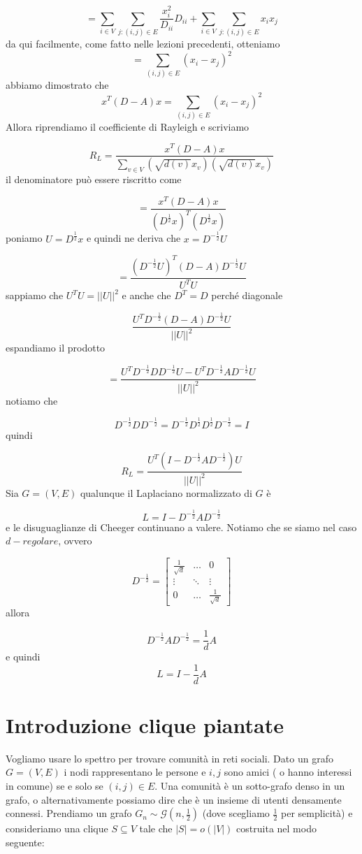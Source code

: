 \documentclass[12pt]{report}
\begin{document}
$$= \sum_{i \in V} \sum_{j : (i,j) \in E} \frac{x_i^2}{D_{ii}} D_{ii} + \sum_{i \in V} \sum_{j : (i,j) \in E} x_i x_j $$
da qui facilmente, come fatto nelle lezioni precedenti, otteniamo
$$= \sum_{(i,j) \in E} (x_i - x_j)^2$$
abbiamo dimostrato che 
$$ x^T (D - A) x= \sum_{(i,j) \in E} (x_i - x_j)^2$$
Allora riprendiamo il coefficiente di Rayleigh e scriviamo

$$R_L = \frac{x^T (D-A) x}{\sum_{v \in V} (\sqrt{d(v)} x_v) (\sqrt{d(v)} x_v)} $$
il denominatore può essere riscritto come

$$= \frac{x^T (D-A) x}{(D^{\frac{1}{2}}x)^T (D^{\frac{1}{2}}x)}$$
poniamo $U = D^{\frac{1}{2}}x$ e quindi ne deriva che $x = D^{-\frac{1}{2}}U$

$$= \frac{(D^{-\frac{1}{2}}U)^T (D-A) D^{-\frac{1}{2}}U}{U^T U}$$
sappiamo che $U^T U = ||U||^2$ e anche che $D^T = D$ perché diagonale

$$\frac{U^T D^{-\frac{1}{2}} (D-A) D^{-\frac{1}{2}}U}{||U||^2}$$
espandiamo il prodotto

$$= \frac{U^T D^{-\frac{1}{2}}D D^{-\frac{1}{2}}U - U^T D^{-\frac{1}{2}}A D^{-\frac{1}{2}}U}{||U||^2}$$
notiamo che 

$$D^{-\frac{1}{2}} D D^{-\frac{1}{2}} = D^{-\frac{1}{2}} D^{\frac{1}{2}} D^{\frac{1}{2}} D^{-\frac{1}{2}} = I$$
quindi

$$R_L = \frac{U^T (I -  D^{-\frac{1}{2}} A D^{-\frac{1}{2}}) U}{||U||^2}$$
Sia $G= (V,E)$ qualunque il Laplaciano normalizzato di $G$ è

$$L = I - D^{-\frac{1}{2}} A D^{-\frac{1}{2}}$$
e le disuguaglianze di Cheeger continuano a valere.
Notiamo che se siamo nel caso $d-regolare$, ovvero

\[  
    D^{-\frac{1}{2}} = \begin{bmatrix}
        \frac{1}{\sqrt{d}} & \dots & 0 \\
        \vdots & \ddots & \vdots \\
        0 & \dots & \frac{1}{\sqrt{d}}
    \end{bmatrix}
\]
allora

$$ D^{-\frac{1}{2}} A D^{-\frac{1}{2}} = \frac{1}{d} A$$
e quindi 
$$L = I - \frac{1}{d} A$$


\section{Introduzione clique piantate}
Vogliamo usare lo spettro per trovare comunità in reti sociali. Dato un grafo $G = (V,E)$ i nodi rappresentano le persone e $i,j$ sono amici ( o hanno interessi in comune) se e solo se $(i,j) \in E$. Una comunità è un sotto-grafo denso in un grafo, o alternativamente possiamo dire che è un insieme di utenti densamente connessi. Prendiamo un grafo $G_n \sim \mathcal{G}(n,\frac{1}{2})$ (dove scegliamo $\frac{1}{2}$ per semplicità) e consideriamo una clique $S \subseteq V$ tale che $|S| = o(|V|)$ costruita nel modo seguente:
\end{document}
